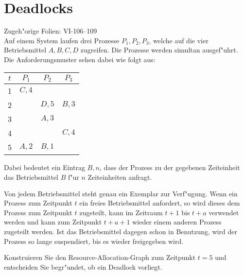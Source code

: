 \section{Deadlocks}

Zugeh"orige Folien: VI-106--109 \\

Auf einem System laufen drei Prozesse $P_1,P_2,P_3$, welche auf die vier
Betriebsmittel $A,B,C,D$ zugreifen.  Die Prozesse werden simultan
ausgef"uhrt.  Die Anforderungsmuster sehen dabei wie folgt aus:

\begin{center}
  \begin{tabular}{cccc}
    \toprule
    $t$ & $P_1$ & $P_2$ & $P_3$ \\
    \midrule
    1   & $C,4$ &       &       \\
    2   &       & $D,5$ & $B,3$ \\
    3   &       & $A,3$ &       \\
    4   &       &       & $C,4$ \\
    5   & $A,2$ & $B,1$ &       \\
    \bottomrule
  \end{tabular}
\end{center}

Dabei bedeutet ein Eintrag $B,n$, dass der Prozess zu der gegebenen
Zeiteinheit das Betriebsmittel $B$ f"ur $n$ Zeiteinheiten anfragt.

Von jedem Betriebsmittel steht genau ein Exemplar zur Verf"ugung.  Wenn
ein Prozess zum Zeitpunkt $t$ ein freies Betriebsmittel anfordert, so
wird dieses dem Prozess zum Zeitpunkt $t$ zugeteilt, kann im Zeitraum $t
+ 1$ bis $t + a$ verwendet werden und kann zum Zeitpunkt $t + a + 1$
wieder einem anderen Prozess zugeteilt werden. Ist das Betriebsmittel
dagegen schon in Benutzung, wird der Prozess so lange suspendiert, bis
es wieder freigegeben wird.

Konstruieren Sie den Resource-Allocation-Graph zum Zeitpunkt $t=5$ und
entscheiden Sie begr"undet, ob ein Deadlock vorliegt.

